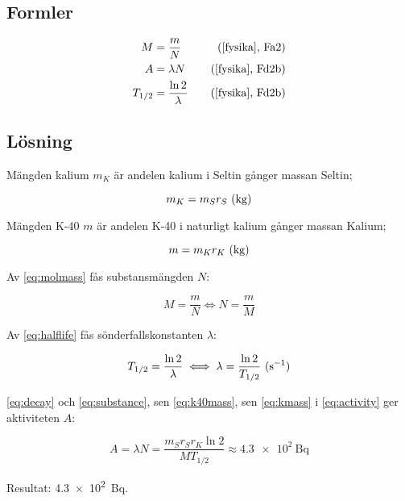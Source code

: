 \subsection*{Formler}

\begin{align}
    M       &= \frac{m}{N}           &\quad \text{(\cite{fysika}, Fa2)}  \label{eq:molmass} \\
    A       &= \lambda N             &\quad \text{(\cite{fysika}, Fd2b)} \label{eq:activity}  \\
    T_{1/2} &= \frac{\ln 2}{\lambda} &\quad \text{(\cite{fysika}, Fd2b)} \label{eq:halflife}
\end{align}

\subsection*{Lösning}

Mängden kalium $m_K$ är andelen kalium i Seltin gånger massan Seltin;

\begin{equation}
    m_K = m_S r_S~\text{(\unit{\kg})} \label{eq:kmass}
\end{equation}

Mängden K-40 $m$ är andelen K-40 i naturligt kalium gånger massan Kalium;

\begin{equation}
    m = m_K r_K~\text{(\unit{\kg})} \label{eq:k40mass}
\end{equation}

Av \eqref{eq:molmass} fås substansmängden $N$:

\begin{equation}
    M = \frac{m}{N} \iff N = \frac{m}{M} \label{eq:substance}
\end{equation}

Av \eqref{eq:halflife} fås sönderfallskonstanten $\lambda$:

\begin{equation}
    T_{1/2} = \frac{\ln 2}{\lambda} \iff \lambda = \frac{\ln 2}{T_{1/2}}~\text{(\unit{\per\s})} \label{eq:decay}
\end{equation}

\eqref{eq:decay} och \eqref{eq:substance}, sen \eqref{eq:k40mass}, sen
\eqref{eq:kmass} i \eqref{eq:activity} ger aktiviteten $A$:

\begin{equation}
    A = \lambda N = \frac{m_S r_S r_K \ln 2}{M T_{1/2}} \approx \qty{4.3e2}{\becquerel}
\end{equation}

Resultat: \qty{4.3e2}{\becquerel}.
